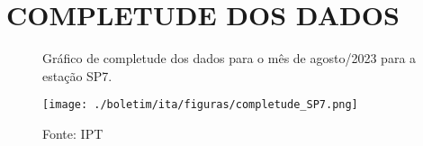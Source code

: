 \section{COMPLETUDE DOS DADOS}

\begin{figure}[htb!]
    \centering
	\captionsetup{justification=raggedright, singlelinecheck=false, width=1\textwidth}
    \caption{Gráfico de completude dos dados para o mês de agosto/2023 para a estação SP7.}
    \begin{mdframed}[
        linecolor=black,
        linewidth=1pt,
        roundcorner=10pt,
    ]
    \texttt{[image: ./boletim/ita/figuras/completude\_SP7.png]} %
    \end{mdframed}
    \caption*{Fonte: IPT}
    \label{fig:completude}
\end{figure}

